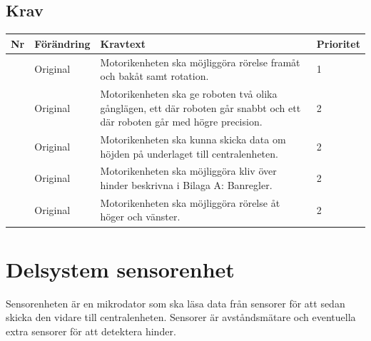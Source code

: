\documentclass[a4paper,titlepage,12pt]{article}
\newcounter{reqNr}
\newcommand{\nextReqNr}{\stepcounter{reqNr}\arabic{reqNr}}
\begin{document}
	\subsection{Krav}
	\begin{table}[h]
		\label{tab:Krav motorikenhet}
		\begin{tabularx}{\textwidth}{|c|l|X|l|}
			\hline
			\textbf{Nr} & \textbf{Förändring} & \textbf{Kravtext} & \textbf{Prioritet} 
				\\ \hline

			\nextReqNr & Original & Motorikenheten ska möjliggöra rörelse framåt och 
				bakåt samt rotation. & 1
				\\ \hline

			\nextReqNr & Original & Motorikenheten ska ge roboten två olika gånglägen,
				ett där roboten går 
				snabbt och ett där roboten går med högre precision.& 2
				\\ \hline

			\nextReqNr & Original & Motorikenheten ska kunna skicka data om höjden 
				på underlaget till centralenheten. & 2
				\\ \hline

			\nextReqNr & Original & Motorikenheten ska möjliggöra kliv över hinder 
				beskrivna i Bilaga A:
  				Banregler. & 2
				\\ \hline

			\nextReqNr & Original & Motorikenheten ska möjliggöra rörelse åt höger 
				och vänster. & 2 
				\\\hline

		\end{tabularx}
	\end{table}


	\section{Delsystem sensorenhet}
	Sensorenheten är en mikrodator som ska läsa data från sensorer för att sedan skicka 
	den vidare till centralenheten. Sensorer är avståndsmätare och eventuella extra sensorer 
	för att detektera hinder.
\end{document}
